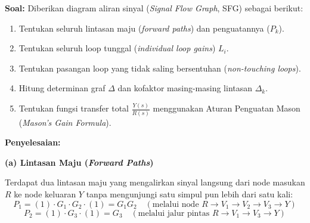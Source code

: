 \documentclass[11pt,a4paper]{article}
\begin{document}
\textbf{Soal:}  
Diberikan diagram aliran sinyal (\textit{Signal Flow Graph}, SFG) sebagai berikut:
\begin{center}
\end{center}
\begin{enumerate}[label=(\alph*)]
    \item Tentukan seluruh lintasan maju (\textit{forward paths}) dan penguatannya ($P_k$).
    \item Tentukan seluruh loop tunggal (\textit{individual loop gains}) $L_i$.
    \item Tentukan pasangan loop yang tidak saling bersentuhan (\textit{non-touching loops}).
    \item Hitung determinan graf $\Delta$ dan kofaktor masing-masing lintasan $\Delta_k$.
    \item Tentukan fungsi transfer total $\frac{Y(s)}{R(s)}$ menggunakan Aturan Penguatan Mason (\textit{Mason's Gain Formula}).
\end{enumerate}

\textbf{Penyelesaian:}

\textbf{(a) Lintasan Maju (\textit{Forward Paths})}

Terdapat dua lintasan maju yang mengalirkan sinyal langsung dari node masukan $R$ ke node keluaran $Y$ tanpa mengunjungi satu simpul pun lebih dari satu kali:
$$P_1 = (1) \cdot G_1 \cdot G_2 \cdot (1) = G_1 G_2 \quad (\text{melalui node } R \to V_1 \to V_2 \to V_3 \to Y)$$
$$P_2 = (1) \cdot G_3 \cdot (1) = G_3 \quad (\text{melalui jalur pintas } R \to V_1 \to V_3 \to Y)$$
\end{document}
